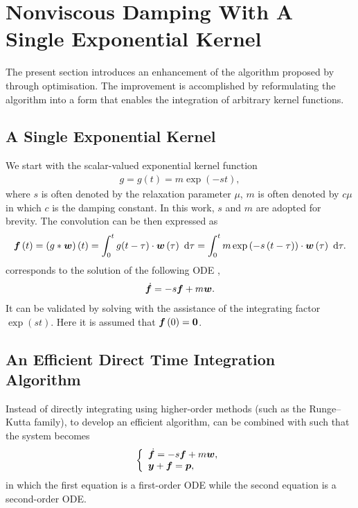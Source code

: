 \section{Nonviscous Damping With A Single Exponential Kernel}\label{sec:single}
The present section introduces an enhancement of the algorithm proposed by \citet{Adhikari2004} through optimisation. The improvement is accomplished by reformulating the algorithm into a form that enables the integration of arbitrary kernel functions.
\subsection{A Single Exponential Kernel}
We start with the scalar-valued exponential kernel function
\begin{gather}
g=g\left(t\right)=m\exp\left(-st\right),
\end{gather}
where $s$ is often denoted by the relaxation parameter $\mu$, $m$ is often denoted by $c\mu$ in which $c$ is the damping constant. In this work, $s$ and $m$ are adopted for brevity.
The convolution can be then expressed as
\begin{gather}\label{eq:single_conv}
\bm{f}\left(t\right)=\left(g*\bm{w}\right)\left(t\right)=\int_0^tg(t-\tau)\cdot\bm{w}\left(\tau\right)~\mathrm{d}\tau=\int_0^tm\exp\left(-s\left(t-\tau\right)\right)\cdot\bm{w}\left(\tau\right)~\mathrm{d}\tau.
\end{gather}
 corresponds to the solution of the following ODE \citep[see, e.g.,][\S~80]{Zwillinger2021},
\begin{gather}\label{eq:single_conv_ode}
\dot{\bm{f}}=-s\bm{f}+m\bm{w}.
\end{gather}
It can be validated by solving  with the assistance of the integrating factor $\exp\left(st\right)$. Here it is assumed that $\bm{f}\left(0\right)=\bm{0}$.
\subsection{An Efficient Direct Time Integration Algorithm}
Instead of directly integrating  using higher-order methods (such as the Runge--Kutta family), to develop an efficient algorithm,  can be combined with  such that the system becomes
\begin{gather}\label{eq:eqv_sys}
\left\{
\begin{array}{l}
\dot{\bm{f}}=-s\bm{f}+m\bm{w},\\
\bm{y}+\bm{f}=\bm{p},
\end{array}\right.
\end{gather}
in which the first equation is a first-order ODE while the second equation is a second-order ODE.


